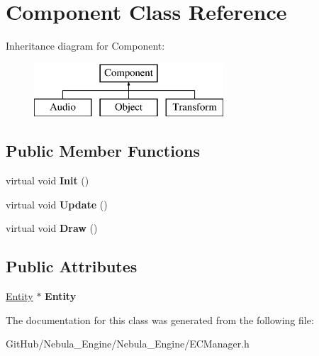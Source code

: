 \hypertarget{class_component}{}\section{Component Class Reference}
\label{class_component}
Inheritance diagram for Component\+:\begin{figure}[H]
\begin{center}
\leavevmode
\includegraphics[height=2.000000cm]{class_component}
\end{center}
\end{figure}
\subsection*{Public Member Functions}
\begin{DoxyCompactItemize}
\item 
\mbox{\label{class_component_a5a5e595fab62ba757f03becc5b101732}} 
virtual void {\bfseries Init} ()
\item 
\mbox{\label{class_component_aaf2ce6dc5752072492f790ad4c7955bb}} 
virtual void {\bfseries Update} ()
\item 
\mbox{\label{class_component_a8622ccd5f24035d48e33292717299313}} 
virtual void {\bfseries Draw} ()
\end{DoxyCompactItemize}
\subsection*{Public Attributes}
\begin{DoxyCompactItemize}
\item 
\mbox{\label{class_component_afffcb68fa3203b4625c991a3a4c38d39}} 
\mbox{\hyperlink{class_entity}{Entity}} $\ast$ {\bfseries Entity}
\end{DoxyCompactItemize}


The documentation for this class was generated from the following file\+:\begin{DoxyCompactItemize}
\item 
Git\+Hub/\+Nebula\+\_\+\+Engine/\+Nebula\+\_\+\+Engine/E\+C\+Manager.\+h\end{DoxyCompactItemize}
